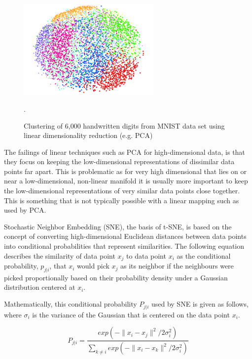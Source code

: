 \documentclass{article}
\begin{document}
\begin{figure}[H]
\centering
\includegraphics[width=0.62\textwidth]{figures/other-cluster}
\caption{Clustering of 6,000 handwritten digits from MNIST data set using linear dimensionality reduction (e.g. PCA)\cite{van2008visualizing}}.
\label{fig:other-cluster}
\end{figure}

The failings of linear techniques such as PCA for high-dimensional data, is that they focus on keeping the low-dimensional representations of dissimilar data points far apart. This is problematic as for very high dimensional that lies on or near a low-dimensional, non-linear manifold it is usually more important to keep the low-dimensional representations of very similar data points close together\cite{van2008visualizing}. This is something that is not typically possible with a linear mapping such as used by PCA.

Stochastic Neighbor Embedding (SNE), the basis of t-SNE, is based on the concept of converting high-dimensional Euclidean distances between data points into conditional probabilities that represent similarities. The following equation describes the similarity of data point $x_j$ to data point $x_i$ as the conditional probability, $p_{j|i}$, that $x_i$ would pick $x_j$ as its neighbor if the neighbours were picked proportionally based on their probability density under a Gaussian distribution centered at $x_i$\cite{van2008visualizing}.

Mathematically, this conditional probability $P_{j|i}$ used by SNE is given as follows, where $\sigma_{i}$ is the variance of the Gaussian that is centered on the data point $x_i$.

\begin{equation}
P_{j|i} = \frac{exp(-\|x_i - x_j\|^2 / 2\sigma_{i}^2)}{\sum_{k \ne i}^{} exp(-\|x_i - x_k\|^2 / 2\sigma_{i}^2)}
\label{eq:tsne}
\end{equation}
\end{document}
